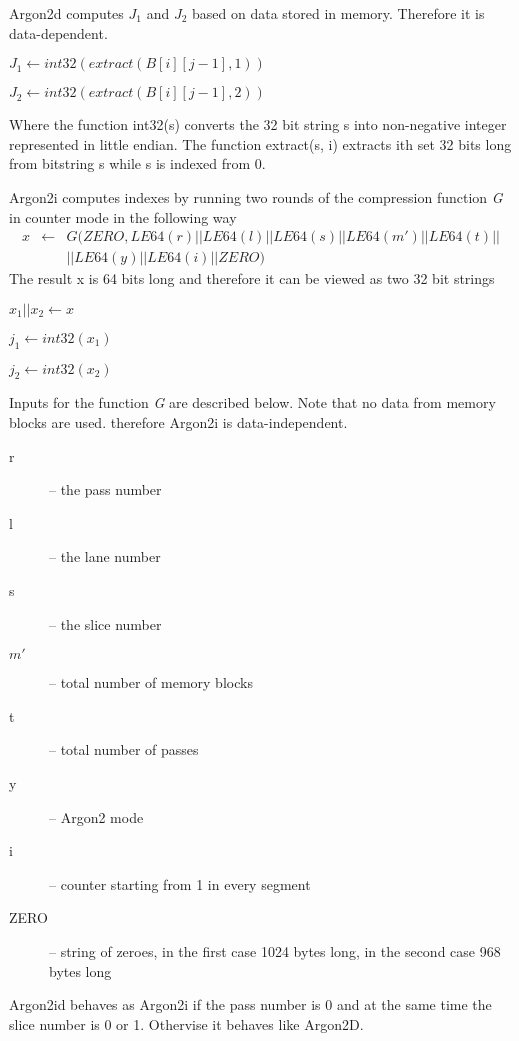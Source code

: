 \documentclass[nolof]{fithesis3}
\begin{document}
Argon2d computes \(J_1\) and \(J_2\) based on data stored in memory. Therefore it is data-dependent.

\(J_1 \leftarrow int32(extract(B[i][j-1], 1))\)

\(J_2 \leftarrow int32(extract(B[i][j-1], 2))\)

Where the function int32(s) converts the 32 bit string s into non-negative integer represented in little endian. The function extract(s, i) extracts ith set 32 bits long from bitstring s while s is indexed from 0.

Argon2i computes indexes by running two rounds of the compression function \emph{G} in counter mode in the following way
\begin{eqnarray*}
x &\leftarrow& G(ZERO, LE64(r) || LE64(l) || LE64(s) || LE64(m') || LE64(t) ||\\
 && || LE64(y) || LE64(i) || ZERO) 
\end{eqnarray*}
The result x is 64 bits long and therefore it can be viewed as two 32 bit strings

\(x_1 || x_2 \leftarrow x\)

\(j_1 \leftarrow int32(x_1)\)

\(j_2 \leftarrow int32(x_2)\)

Inputs for the function \emph{G} are described below. Note that no data from memory blocks are used. therefore Argon2i is data-independent.

\begin{description}
\item[r] -- the pass number

\item[l] -- the lane number

\item[s] -- the slice number

\item[\(m'\)] -- total number of memory blocks

\item[t] -- total number of passes

\item[y] -- Argon2 mode

\item[i] -- counter starting from 1 in every segment

\item[ZERO] -- string of zeroes, in the first case 1024 bytes long, in the second case 968 bytes long
\end{description}

Argon2id behaves as Argon2i if the pass number is 0 and at the same time the slice number is 0 or 1. Othervise it behaves like Argon2D.
\end{document}

